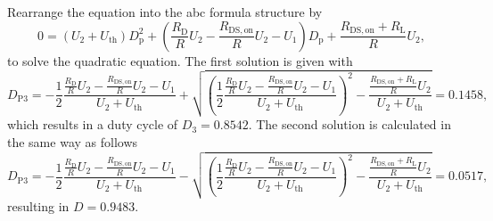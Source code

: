 \begin{solutionblock}
    Rearrange the equation into the abc formula structure by
    \begin{equation}
        0 = \left(U_2 + U_{\mathrm{th}} \right)D_{\mathrm{p}}^2 + \left(\frac{R_{\mathrm{D}}}{R}U_2 - \frac{R_{\mathrm{DS,on}}}{R}U_2 -U_1\right)D_{\mathrm{p}} + \frac{R_{\mathrm{DS,on}}+R_{\mathrm{L}}}{R} U_2,
    \end{equation}
    to solve the quadratic equation.
    The first solution is given with
    \begin{equation}
        D_{\mathrm{P3}} = -\frac{1}{2} \frac{\frac{R_{\mathrm{D}}}{R}U_2 - \frac{R_{\mathrm{DS,on}}}{R}U_2 - U_1}{U_2 + U_{\mathrm{th}}} + \sqrt{\left(\frac{1}{2} \frac{\frac{R_{\mathrm{D}}}{R}U_2 - \frac{R_{\mathrm{DS,on}}}{R}U_2 - U_1}{U_2 + U_{\mathrm{th}}}\right)^2 - \frac{\frac{R_{\mathrm{DS,on}}+R_{\mathrm{L}}}{R}U_2}{U_2+U_{\mathrm{th}}}}
        = 0.1458,
    \end{equation}
    which results in a duty cycle of $D_3 = 0.8542$.
    The second solution is calculated in the same way as follows
    \begin{equation}
        D_{\mathrm{P3}} = -\frac{1}{2} \frac{\frac{R_{\mathrm{D}}}{R}U_2 - \frac{R_{\mathrm{DS,on}}}{R}U_2 - U_1}{U_2 + U_{\mathrm{th}}} - \sqrt{\left(\frac{1}{2} \frac{\frac{R_{\mathrm{D}}}{R}U_2 - \frac{R_{\mathrm{DS,on}}}{R}U_2 - U_1}{U_2 + U_{\mathrm{th}}}\right)^2 - \frac{\frac{R_{\mathrm{DS,on}}+R_{\mathrm{L}}}{R}U_2}{U_2+U_{\mathrm{th}}}}
        = 0.0517,
    \end{equation}
    resulting in $D = 0.9483$.

\end{solutionblock}



